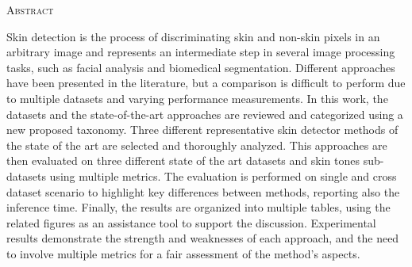 \begin{center}
  \textsc{Abstract}
\end{center}
%
\noindent
Skin detection is the process of discriminating skin and non-skin pixels in an arbitrary image and represents an intermediate step in several image processing tasks, such as facial analysis and biomedical segmentation.
Different approaches have been presented in the literature, but a comparison is difficult to perform due to multiple datasets and varying performance measurements.
In this work, the datasets and the state-of-the-art approaches are reviewed and categorized using a new proposed taxonomy.
Three different representative skin detector methods of the state of the art are selected and thoroughly analyzed. This approaches are then evaluated on three different state of the art datasets and skin tones sub-datasets using multiple metrics.
The evaluation is performed on single and cross dataset scenario to highlight key differences between methods, reporting also the inference time.
Finally, the results are organized into multiple tables, using the related figures as an assistance tool to support the discussion. %
Experimental results demonstrate the strength and weaknesses of each approach, and the need to involve multiple metrics for a fair assessment of the method's aspects.
